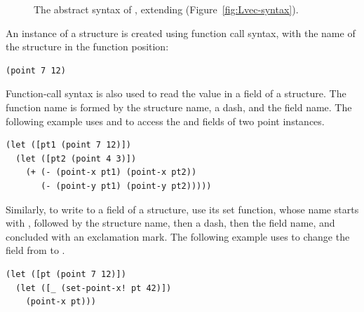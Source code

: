 \documentclass[7x10]{TimesAPriori_MIT}%
\newcommand{\gray}[1]{{\color{gray} #1}}
\begin{document}
{\begin{figure}[tbp]
\centering
\fbox{
\begin{minipage}{0.96\textwidth}
\[
\begin{array}{l}
  \gray{\LintASTRacket{}} \\ \hline
  \gray{\LvarASTRacket{}} \\ \hline
  \gray{\LifASTRacket{}} \\ \hline
  \gray{\LwhileASTRacket} \\ \hline
  \gray{\LtupASTRacket} \\  \hline
  \LstructASTRacket \\
\begin{array}{lcl}
  \LangStruct{} &::=& \PROGRAMDEFSEXP{\code{'()}}{\LP\Def\ldots\RP)}{\Exp}
\end{array}
\end{array}
\]
\end{minipage}
}
\caption{The abstract syntax of \LangStruct{}, extending \LangVec{}
  (Figure~\ref{fig:Lvec-syntax}).}
\label{fig:Lstruct-syntax}
\end{figure}

An instance of a structure is created using function call syntax, with
the name of the structure in the function position:
\begin{lstlisting}
(point 7 12)
\end{lstlisting}
Function-call syntax is also used to read the value in a field of a
structure. The function name is formed by the structure name, a dash,
and the field name. The following example uses  and
 to access the  and  fields of two point
instances.
\begin{center}
\begin{lstlisting}
(let ([pt1 (point 7 12)])
  (let ([pt2 (point 4 3)])
    (+ (- (point-x pt1) (point-x pt2))
       (- (point-y pt1) (point-y pt2)))))
\end{lstlisting}
\end{center}
Similarly, to write to a field of a structure, use its set function,
whose name starts with , followed by the structure name,
then a dash, then the field name, and concluded with an exclamation
mark. The following example uses  to change the
 field from  to .
\begin{center}
  \begin{lstlisting}
(let ([pt (point 7 12)])
  (let ([_ (set-point-x! pt 42)])
    (point-x pt)))
\end{lstlisting}
\end{center}

}
\end{document}
